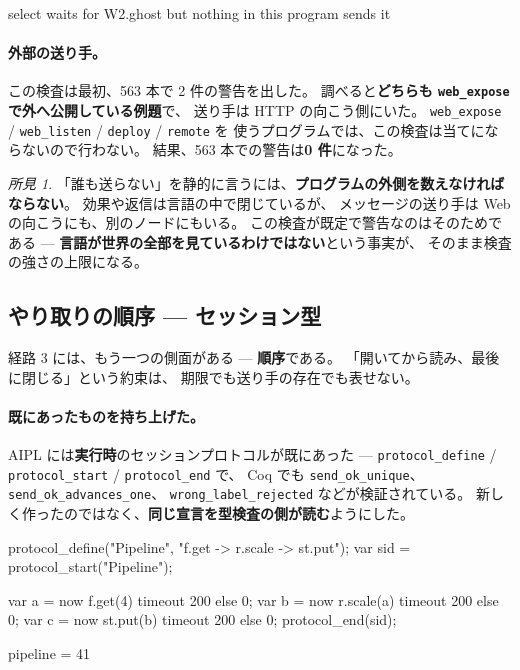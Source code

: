 \documentclass[11pt,a4paper]{ltjsarticle}
\theoremstyle{definition}
\theoremstyle{remark}
\newtheorem{finding}[theorem]{所見}
\begin{document}
\begin{term}
[warn] select waits for W2.ghost but nothing in this program sends it
\end{term}

\paragraph{外部の送り手。}
この検査は最初、563 本で 2 件の警告を出した。
調べると\textbf{どちらも \texttt{web\_expose} で外へ公開している例題}で、
送り手は HTTP の向こう側にいた。
\texttt{web\_expose} / \texttt{web\_listen} / \texttt{deploy} / \texttt{remote} を
使うプログラムでは、この検査は当てにならないので行わない。
結果、563 本での警告は\textbf{0 件}になった。

\begin{finding}
「誰も送らない」を静的に言うには、\textbf{プログラムの外側を数えなければならない}。
効果や返信は言語の中で閉じているが、
メッセージの送り手は Web の向こうにも、別のノードにもいる。
この検査が既定で警告なのはそのためである ---
\textbf{言語が世界の全部を見ているわけではない}という事実が、
そのまま検査の強さの上限になる。
\end{finding}

\subsection{やり取りの順序 --- セッション型}
\label{sec:session}

経路 3 には、もう一つの側面がある --- \textbf{順序}である。
「開いてから読み、最後に閉じる」という約束は、
期限でも送り手の存在でも表せない。

\paragraph{既にあったものを持ち上げた。}
AIPL には\textbf{実行時}のセッションプロトコルが既にあった ---
\texttt{protocol\_define} / \texttt{protocol\_start} / \texttt{protocol\_end} で、
Coq でも \texttt{send\_ok\_unique}、\texttt{send\_ok\_advances\_one}、
\texttt{wrong\_label\_rejected} などが検証されている。
新しく作ったのではなく、\textbf{同じ宣言を型検査の側が読む}ようにした。

\begin{aipl}
protocol_define("Pipeline", "f.get -> r.scale -> st.put");
var sid = protocol_start("Pipeline");

var a = now f.get(4)    timeout 200 else 0;
var b = now r.scale(a)  timeout 200 else 0;
var c = now st.put(b)   timeout 200 else 0;
protocol_end(sid);
\end{aipl}
\begin{term}
pipeline = 41
\end{term}
\end{document}

